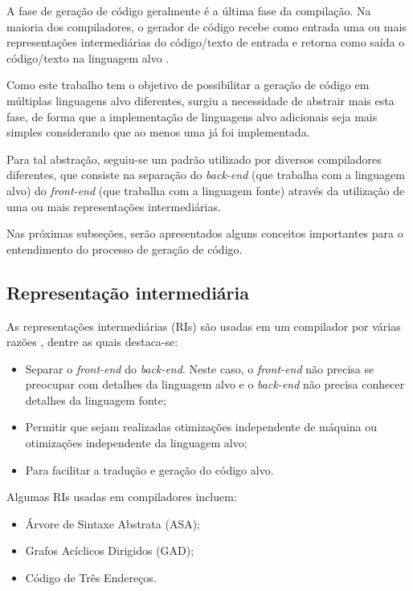 \documentclass[
	12pt,				%
	openright,			%
	oneside,			%
	a4paper,			%
	main=brazil,
	english,			%
	]{ufsj-abntex2}
\begin{document}
A fase de geração de código geralmente é a última fase da compilação. Na maioria dos compiladores, o gerador de código recebe como entrada uma ou mais representações intermediárias do código/texto de entrada e retorna como saída o código/texto na linguagem alvo \cite{dragonBook}. 

Como este trabalho tem o objetivo de possibilitar a geração de código em múltiplas linguagens alvo diferentes, surgiu a necessidade de abstrair mais esta fase, de forma que a implementação de linguagens alvo adicionais seja mais simples considerando que ao menos uma já foi implementada.

Para tal abstração, seguiu-se um padrão utilizado por diversos compiladores diferentes, que consiste na separação do \textit{back-end} (que trabalha com a linguagem alvo) do \textit{front-end} (que trabalha com a linguagem fonte) através da utilização de uma ou mais representações intermediárias. 

Nas próximas subseções, serão apresentados alguns conceitos importantes para o entendimento do processo de geração de código. 

\subsection{Representação intermediária}

As representações intermediárias (RIs) são usadas em um compilador por várias razões \cite{dragonBook}, dentre as quais destaca-se: 
\begin{itemize}
    \item Separar o \textit{front-end} do \textit{back-end}. Neste caso, o \textit{front-end} não precisa se preocupar com detalhes da linguagem alvo e o \textit{back-end} não precisa conhecer detalhes da linguagem fonte;
    \item Permitir que sejam realizadas otimizações independente de máquina ou otimizações independente da linguagem alvo; 
    \item Para facilitar a tradução e geração do código alvo.    
\end{itemize}

Algumas RIs usadas em compiladores incluem:  
\begin{itemize}
    \item Árvore de Sintaxe Abstrata (ASA); 
    \item Grafos Acíclicos Dirigidos (GAD); 
    \item Código de Três Endereços. 
\end{itemize}
\end{document}
